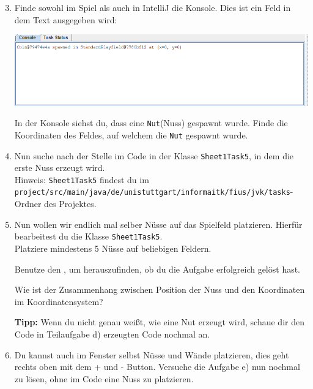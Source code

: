     \begin{enumerate}\setcounter{enumi}{2}

        \item Finde sowohl im Spiel als auch in IntelliJ die Konsole. Dies ist ein Feld in dem Text ausgegeben wird:
        \begin{center}
        \includegraphics[width=\linewidth]{./figures/console.PNG}
        \end{center}
        
        In der Konsole siehst du, dass eine \texttt{Nut}(Nuss) gespawnt  wurde.
        Finde die Koordinaten des Feldes, auf welchem die \texttt{Nut} gespawnt wurde.
        
        \item Nun suche nach der Stelle im Code in der Klasse \lstinline{Sheet1Task5}, in dem die erste Nuss erzeugt wird.\\
        Hinweis: \lstinline{Sheet1Task5} findest du im \lstinline{project/src/main/java/de/unistuttgart/informaitk/fius/jvk/tasks}-Ordner des Projektes.
        \newpage
        \item Nun wollen wir endlich mal selber Nüsse auf das Spielfeld platzieren.
        Hierfür bearbeitest du die Klasse \lstinline{Sheet1Task5}.\\
        Platziere mindestens 5 Nüsse auf beliebigen Feldern.
        
        Benutze den , um herauszufinden, ob du die Aufgabe erfolgreich gelöst hast.
        
        Wie ist der Zusammenhang zwischen Position der Nuss und den Koordinaten im Koordinatensystem?
        
        \textbf{Tipp:} Wenn du nicht genau weißt, wie eine Nut erzeugt wird, schaue dir den Code in Teilaufgabe d) erzeugten Code nochmal an.
        \item Du kannst auch im Fenster selbst Nüsse und Wände platzieren, dies geht rechts oben mit dem + und - Button. Versuche die Aufgabe e) nun nochmal zu lösen, ohne im Code eine Nuss zu platzieren.
        \end{enumerate}
